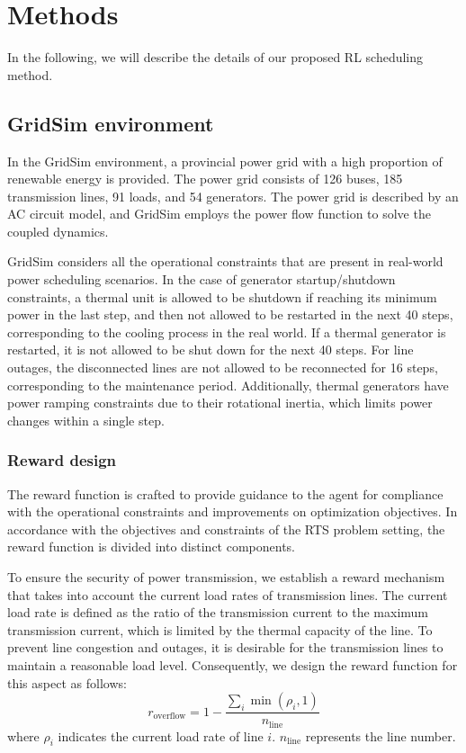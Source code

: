 \section*{Methods}\label{sec11}

In the following, we will describe the details of our proposed RL scheduling method.

\subsection*{GridSim environment}
In the GridSim environment, a provincial power grid with a high proportion of renewable energy is provided. The power grid consists of 126 buses, 185 transmission lines, 91 loads, and 54 generators. The power grid is described by an AC circuit model, and GridSim employs the power flow function to solve the coupled dynamics.

GridSim considers all the operational constraints that are present in real-world power scheduling scenarios.
In the case of generator startup/shutdown constraints, a thermal unit is allowed to be shutdown if reaching its minimum power in the last step, and then not allowed to be restarted in the next 40 steps, corresponding to the cooling process in the real world. If a thermal generator is restarted, it is not allowed to be shut down for the next 40 steps. 
For line outages, the disconnected lines are not allowed to be reconnected for 16 steps, corresponding to the maintenance period. 
Additionally, thermal generators have power ramping constraints due to their rotational inertia, which limits power changes within a single step. 

\subsubsection*{Reward design}
The reward function is crafted to provide guidance to the agent for compliance with the operational constraints and improvements on optimization objectives.
In accordance with the objectives and constraints of the RTS problem setting, the reward function is divided into distinct components.

To ensure the security of power transmission, we establish a reward mechanism that takes into account the current load rates of transmission lines. The current load rate is defined as the ratio of the transmission current to the maximum transmission current, which is limited by the thermal capacity of the line. 
To prevent line congestion and outages, it is desirable for the transmission lines to maintain a reasonable load level. Consequently, we design the reward function for this aspect as follows:
\begin{equation}
    r_{\text{overflow}}=1-\frac{\sum_i\min(\rho_i,1)}{n_{\text{line}}}
\end{equation}
where $\rho_i$ indicates the current load rate of line $i$. $n_{\text{line}}$ represents the line number. 


